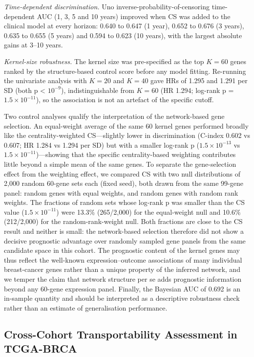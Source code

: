 \documentclass[12pt]{article}
\begin{document}
\emph{Time-dependent discrimination.} Uno inverse-probability-of-censoring
time-dependent AUC (1, 3, 5 and 10 years) improved when CS was added to the
clinical model at every horizon: 0.640 to 0.647 (1 year), 0.652 to 0.676 (3
years), 0.635 to 0.655 (5 years) and 0.594 to 0.623 (10 years), with the
largest absolute gains at 3--10 years.

\emph{Kernel-size robustness.} The kernel size was pre-specified as the top
$K = 60$ genes ranked by the structure-based control score before any model
fitting. Re-running the univariate analysis with $K = 20$ and $K = 40$
gave HRs of 1.295 and 1.291 per SD (both p < $10^{-9}$), indistinguishable
from $K = 60$ (HR 1.294; log-rank p = $1.5\times10^{-11}$), so the
association is not an artefact of the specific cutoff.

Two
control analyses qualify the interpretation of the network-based gene
selection. An equal-weight average of the same 60 kernel genes performed
broadly like the centrality-weighted CS---slightly lower in discrimination
(C-index 0.602 vs 0.607; HR 1.284 vs 1.294 per SD) but with a smaller
log-rank p ($1.5\times10^{-13}$ vs $1.5\times10^{-11}$)---showing that the
specific centrality-based weighting contributes little beyond a simple mean
of the same genes. To separate the gene-selection effect from the weighting
effect, we compared CS with two null distributions of 2,000 random
60-gene sets each (fixed seed), both drawn from the same 99-gene panel:
random genes with equal weights, and random genes with random rank weights.
The fractions of random sets whose log-rank p was smaller than the CS value
($1.5\times10^{-11}$) were 13.3\% (265/2,000) for the equal-weight null
and 10.6\% (212/2,000) for the random-rank-weight null. Both fractions are
close to the CS result and neither is small: the network-based selection
therefore did not show a decisive prognostic advantage over randomly
sampled gene panels from the same candidate space in this cohort. The prognostic content of the kernel genes may thus
reflect the well-known expression--outcome associations of many individual
breast-cancer genes rather than a unique property of the inferred network,
and we temper the claim that network structure per se adds prognostic
information beyond any 60-gene expression panel. Finally, the
Bayesian AUC of 0.692 is an in-sample quantity and should be interpreted as
a descriptive robustness check rather than an estimate of generalisation
performance.

\subsection{Cross-Cohort Transportability Assessment in TCGA-BRCA}
\end{document}
